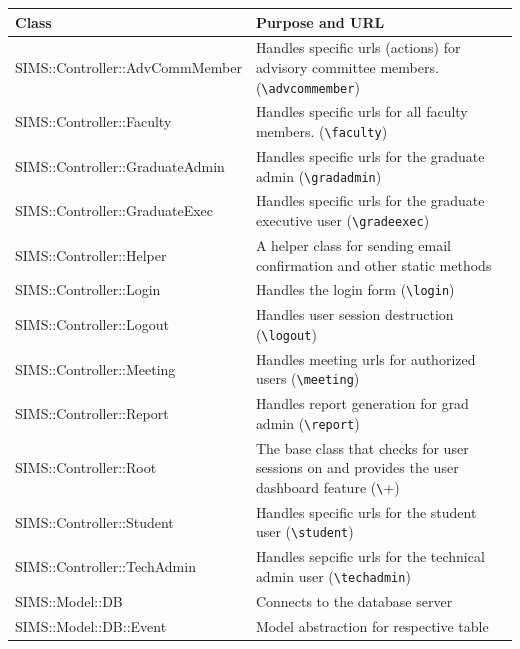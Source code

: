 \documentclass{journal}
\begin{document}
\begin{tabular}{| l | p{7cm} |}
\hline
 Class                                                           & Purpose and URL \\
\hline
\hline
 SIMS::Controller::AdvCommMember                                 &  Handles specific urls (actions) for advisory committee members. (\verb+\advcommember+) \\ \hline
 SIMS::Controller::Faculty                                       &  Handles specific urls for all faculty members. (\verb+\faculty+) \\ \hline
 SIMS::Controller::GraduateAdmin                                 &  Handles specific urls for the graduate admin (\verb+\gradadmin+) \\ \hline
 SIMS::Controller::GraduateExec                                  &  Handles specific urls for the graduate executive user (\verb+\gradeexec+) \\ \hline
 SIMS::Controller::Helper                                        &  A helper class for sending email confirmation and other static methods \\ \hline
 SIMS::Controller::Login                                         &  Handles the login form (\verb+\login+) \\ \hline
 SIMS::Controller::Logout                                        &  Handles user session destruction (\verb+\logout+) \\ \hline
 SIMS::Controller::Meeting                                       &  Handles meeting urls for authorized users (\verb+\meeting+) \\ \hline
 SIMS::Controller::Report                                        &  Handles report generation for grad admin (\verb+\report+) \\ \hline
 SIMS::Controller::Root                                          &  The base class that checks for user sessions on and provides the user dashboard feature (\verb+\+) \\ \hline
 SIMS::Controller::Student                                       &  Handles specific urls for the student user (\verb+\student+) \\ \hline
 SIMS::Controller::TechAdmin                                     &  Handles sepcific urls for the technical admin user (\verb+\techadmin+) \\ \hline
 SIMS::Model::DB                                                 &  Connects to the database server \\ \hline
 SIMS::Model::DB::Event                                          &  Model abstraction for respective table\\ \hline

\end{tabular}
\end{document}
